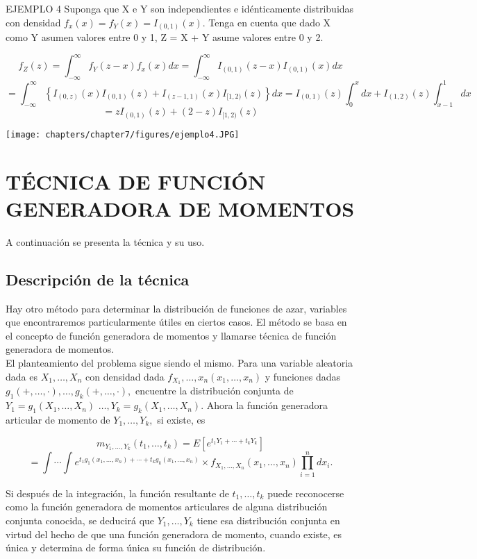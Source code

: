 EJEMPLO 4 Suponga que X e Y son independientes e idénticamente distribuidas con densidad $f_{x}(x)=f_{Y}(x)=I_{(0,1)}(x) .$ Tenga en cuenta que dado  X como Y asumen valores entre 0 y 1, Z = X + Y asume valores entre 0 y 2.
\begin{center}
$$
f_{Z}(z) =\int_{-\infty}^{\infty} f_{Y}(z-x) f_{x}(x) d x
=\int_{-\infty}^{\infty} I_{(0,1)}(z-x) I_{(0,1)}(x) d x
$$
$$
=\int_{-\infty}^{\infty}\left\{I_{(0, z)}(x) I_{(0,1)}(z)+I_{(z-1,1)}(x) I_{[1,2)}(z)\right\} d x
=I_{(0,1)}(z) \int_{0}^{x} d x+I_{(1,2)}(z) \int_{x-1}^{1} d x
$$
$$
=z I_{(0,1)}(z)+(2-z) I_{[1,2)}(z)
$$

\texttt{[image: chapters/chapter7/figures/ejemplo4.JPG]}

\end{center}
\section{TÉCNICA DE FUNCIÓN GENERADORA DE MOMENTOS}
A continuación se presenta la técnica y su uso.
\subsection{Descripción de la técnica}

Hay otro método para determinar la distribución de funciones de azar, variables que encontraremos particularmente útiles en ciertos casos. El método se basa en el concepto de función generadora de momentos y llamarse técnica de función generadora de momentos.\\
El planteamiento del problema sigue siendo el mismo. Para una variable aleatoria dada es $X_{1}, \ldots, X_{n}$ con densidad dada $f_{X_{1}}, \ldots, x_{n}\left(x_{1}, \ldots, x_{n}\right)$  y funciones dadas $g_{1}(+, \ldots, \cdot), \ldots, g_{k}(+, \ldots, \cdot),$ encuentre la distribución conjunta de $Y_{1}=g_{1}\left(X_{1}, \ldots, X_{n}\right)$
$\ldots, Y_{k}=g_{k}\left(X_{1}, \ldots, X_{n}\right) .$ Ahora la función generadora articular de momento de $Y_{1}, \ldots, Y_{k},$ si existe, es

\begin{center}
$$m_{Y_{1}, \ldots, Y_{k}}\left(t_{1}, \ldots, t_{k}\right)=E\left[e^{t_{1} Y_{1}+\cdots+t_{k} Y_{k}}\right] $$
$$=\int \cdots \int e^{t_{1} g_{1}\left(x_{1}, \ldots, x_{n}\right)+\cdots+t_{k} g_{k}\left(x_{1}, \ldots, x_{n}\right)}
\times f_{X_{1}, \ldots, X_{n}}\left(x_{1}, \ldots, x_{n}\right) \prod_{i=1}^{n} d x_{i}.$$
\end{center}
Si después de la integración, la función resultante de $t_{1}, \ldots, t_{k}$ puede reconocerse como la función generadora de momentos articulares de alguna distribución conjunta conocida, se deducirá que $Y_{1}, \ldots, Y_{k}$ tiene esa distribución conjunta en virtud del hecho de que una función generadora de momento, cuando existe, es única y determina de forma única su función de distribución.\\

